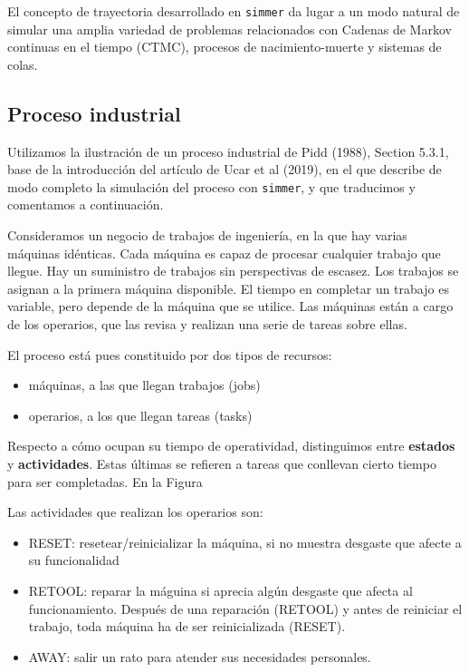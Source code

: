 \documentclass[
]{book}
\providecommand{\tightlist}{%
  \setlength{\itemsep}{0pt}\setlength{\parskip}{0pt}}
\theoremstyle{definition}
\theoremstyle{definition}
\theoremstyle{definition}
\theoremstyle{definition}
\theoremstyle{remark}
\begin{document}
El concepto de trayectoria desarrollado en \texttt{simmer} da lugar a un modo natural de simular una amplia variedad de problemas relacionados con Cadenas de Markov continuas en el tiempo (CTMC), procesos de nacimiento-muerte y sistemas de colas.

\hypertarget{proceso-industrial}{%
\subsection{Proceso industrial}\label{proceso-industrial}}

Utilizamos la ilustración de un proceso industrial de Pidd (1988), Section 5.3.1, base de la introducción del artículo de Ucar et al (2019), en el que describe de modo completo la simulación del proceso con \texttt{simmer}, y que traducimos y comentamos a continuación.

Consideramos un negocio de trabajos de ingeniería, en la que hay varias máquinas idénticas. Cada máquina es capaz de procesar cualquier trabajo que llegue. Hay un suministro de trabajos sin perspectivas de escasez. Los trabajos se asignan a la primera máquina disponible. El tiempo en completar un trabajo es variable, pero depende de la máquina que se utilice. Las máquinas están a cargo de los operarios, que las revisa y realizan una serie de tareas sobre ellas.

El proceso está pues constituido por dos tipos de recursos:

\begin{itemize}
\tightlist
\item
  máquinas, a las que llegan trabajos (jobs)
\item
  operarios, a los que llegan tareas (tasks)
\end{itemize}

Respecto a cómo ocupan su tiempo de operatividad, distinguimos entre \textbf{estados} y \textbf{actividades}. Estas últimas se refieren a tareas que conllevan cierto tiempo para ser completadas. En la Figura

Las actividades que realizan los operarios son:

\begin{itemize}
\tightlist
\item
  RESET: resetear/reinicializar la máquina, si no muestra desgaste que afecte a su funcionalidad
\item
  RETOOL: reparar la máguina si aprecia algún desgaste que afecta al funcionamiento.
  Después de una reparación (RETOOL) y antes de reiniciar el trabajo, toda máquina ha de ser reinicializada (RESET).
\item
  AWAY: salir un rato para atender sus necesidades personales.
\end{itemize}
\end{document}
